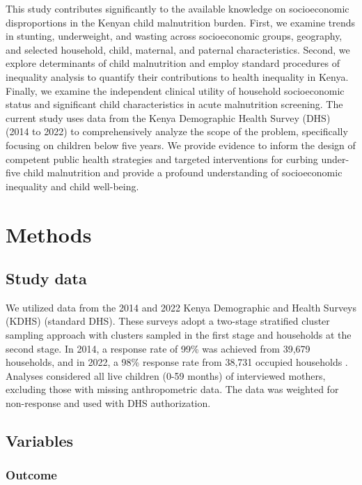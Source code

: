 \documentclass[sn-basic,Numbered,pdflatex]{sn-jnl}
\theoremstyle{remark}
\theoremstyle{definition}
\begin{document}
This study contributes significantly to the available knowledge on
socioeconomic disproportions in the Kenyan child malnutrition burden.
First, we examine trends in stunting, underweight, and wasting across
socioeconomic groups, geography, and selected household, child,
maternal, and paternal characteristics. Second, we explore determinants
of child malnutrition and employ standard procedures of inequality
analysis to quantify their contributions to health inequality in Kenya.
Finally, we examine the independent clinical utility of household
socioeconomic status and significant child characteristics in acute
malnutrition screening. The current study uses data from the Kenya
Demographic Health Survey (DHS) (2014 to 2022) to comprehensively
analyze the scope of the problem, specifically focusing on children
below five years. We provide evidence to inform the design of competent
public health strategies and targeted interventions for curbing
under-five child malnutrition and provide a profound understanding of
socioeconomic inequality and child well-being.

\hypertarget{sec11}{%
\section{Methods}\label{sec11}}

\hypertarget{study-data}{%
\subsection{Study data}\label{study-data}}

We utilized data from the 2014 and 2022 Kenya Demographic and Health
Surveys (KDHS) (standard DHS). These surveys adopt a two-stage
stratified cluster sampling approach with clusters sampled in the first
stage and households at the second stage. In 2014, a response rate of
99\% was achieved from 39,679 households, and in 2022, a 98\% response
rate from 38,731 occupied households \citep{KNBSICF2015, KNBSICF2023}.
Analyses considered all live children (0-59 months) of interviewed
mothers, excluding those with missing anthropometric data. The data was
weighted for non-response and used with DHS authorization.

\hypertarget{variables}{%
\subsection{Variables}\label{variables}}

\hypertarget{outcome}{%
\subsubsection{Outcome}\label{outcome}}
\end{document}
